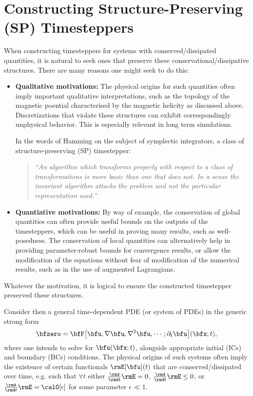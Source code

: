 \section{Constructing Structure-Preserving (SP) Timesteppers}
    When constructing timesteppers for systems with conserved/dissipated quantities, it is natural to seek ones that preserve these conservational/dissipative structures. There are many reasons one might seek to do this:
    \begin{itemize}
        \item  {\bf Qualitative motivations:} The physical origins for such quantities often imply important qualitative interpretations, such as the topology of the magnetic poential characterised by the magnetic helicity as discussed above. Discretizations that violate these structures can exhibit correspondingly unphysical behavior. This is especially relevant in long term simulations. 
        
        In the words of Hamming on the subject of symplectic integrators, a class of structure-preserving (SP) timestepper: \cite{Hamming_1986}
        \begin{quotation}
            \emph{``An algorithm which transforms properly with respect to a class of transformations is more basic than one that does not. In a sense the invariant algorithm attacks the problem and not the particular representation used.''}
        \end{quotation}
        

        \item  {\bf Quantiative motivations:} By way of example, the conservation of global quantities can often provide useful bounds on the outputs of the timesteppers, which can be useful in proving many results, such as well-posedness. The conservation of local quantities can alternatively help in providing parameter-robust bounds for convergence results, or allow the modification of the equations without fear of modification of the numerical results, such as in the use of augmented Lagrangians. \cite{FMW19, LFM22}
    \end{itemize}
    Whatever the motivation, it is logical to ensure the constructed timestepper preserved these structures.

    Consider then a general time-dependent PDE (or system of PDEs) in the generic strong form
    \begin{equation}\label{eqn:general time-dependent PDE}
        \bfzero  =  \bfF\!\left[\bfu, \nabla\bfu, \nabla^{2}\bfu, \cdots; \partial_{t}\bfu\right]\!(\bfx; t),
    \end{equation}
    where one intends to solve for $\bfu(\bfx; t)$, alongside appropriate initial (ICs) and boundary (BCs) conditions. The physical origins of such systems often imply the existence of certain functionals $\rmE[\bfu](t)$ that are conserved/dissipated over time, e.g. such that $\forall  t$ either $\frac{\rmd}{\rmd t}\rmE  =  0$, $\frac{\rmd}{\rmd t}\rmE  \leq  0$, or $\frac{\rmd}{\rmd t}\rmE  =  \calO[\epsilon]$ for some parameter $\epsilon \ll 1$.
    
